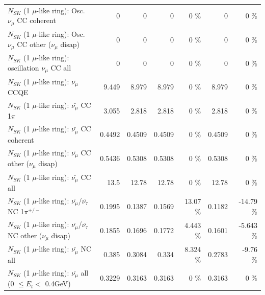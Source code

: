 \begin{table}
\begin{tabular}{| l | r | r | r  r | r  r |}
                        $N_{SK}$ (1 $\mu$-like ring): Osc. $\nu_\mu$ CC coherent &               0 &               0 &               0 &        0 \%  &               0 &        0 \%  \\ 
         $N_{SK}$ (1 $\mu$-like ring): Osc. $\nu_\mu$ CC other ($\nu_\mu$ disap) &               0 &               0 &               0 &        0 \%  &               0 &        0 \%  \\ 
                      $N_{SK}$ (1 $\mu$-like ring): oscillation $\nu_\mu$ CC all &               0 &               0 &               0 &        0 \%  &               0 &        0 \%  \\ 
\hline
\hline
                              $N_{SK}$ (1 $\mu$-like ring): $\bar{\nu_\mu}$ CCQE &           9.449 &           8.979 &           8.979 &        0 \%  &           8.979 &        0 \%  \\ 
                         $N_{SK}$ (1 $\mu$-like ring): $\bar{\nu_\mu}$ CC 1$\pi$ &           3.055 &           2.818 &           2.818 &        0 \%  &           2.818 &        0 \%  \\ 
                       $N_{SK}$ (1 $\mu$-like ring): $\bar{\nu_\mu}$ CC coherent &          0.4492 &          0.4509 &          0.4509 &        0 \%  &          0.4509 &        0 \%  \\ 
        $N_{SK}$ (1 $\mu$-like ring): $\bar{\nu_\mu}$ CC other ($\nu_\mu$ disap) &          0.5436 &          0.5308 &          0.5308 &        0 \%  &          0.5308 &        0 \%  \\ 
                          $N_{SK}$ (1 $\mu$-like ring): $\bar{\nu_{\mu}}$ CC all &            13.5 &           12.78 &           12.78 &        0 \%  &           12.78 &        0 \%  \\ 
\hline
  $N_{SK}$ (1 $\mu$-like ring): $\bar{\nu_\mu}$/$\bar{\nu_\tau}$ NC 1$\pi^{+/-}$ &          0.1995 &          0.1387 &          0.1569 &    13.07 \%  &          0.1182 &   -14.79 \%  \\ 
$N_{SK}$ (1 $\mu$-like ring): $\bar{\nu_\mu}$/$\bar{\nu_\tau}$ NC other ($\nu_\mu$ disap) &          0.1855 &          0.1696 &          0.1772 &    4.443 \%  &          0.1601 &   -5.643 \%  \\ 
                          $N_{SK}$ (1 $\mu$-like ring): $\bar{\nu_{\mu}}$ NC all &           0.385 &          0.3084 &           0.334 &    8.324 \%  &          0.2783 &    -9.76 \%  \\ 
\hline
   $N_{SK}$ (1 $\mu$-like ring): $\bar{\nu_{\mu}}$ all (0 $\leq E_{t} <$ 0.4GeV) &          0.3229 &          0.3163 &          0.3163 &        0 \%  &          0.3163 &        0 \%  \\ 

\end{tabular}
\end{table}
